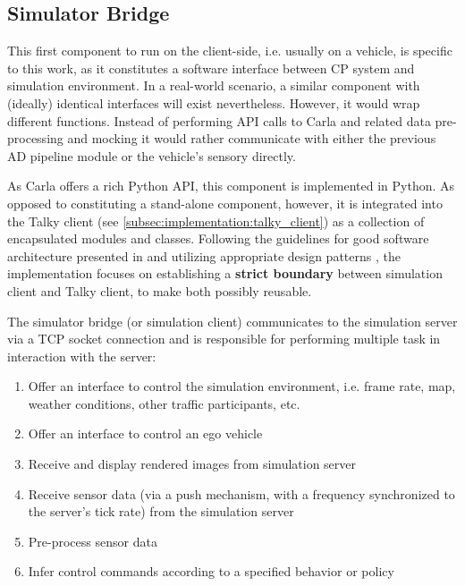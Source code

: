 \subsection{Simulator Bridge}
\label{subsec:implementation:simulator_bridge}
This first component to run on the client-side, i.e. usually on a vehicle, is specific to this work, as it constitutes a software interface between CP system and simulation environment. In a real-world scenario, a similar component with (ideally) identical interfaces will exist nevertheless. However, it would wrap different functions. Instead of performing API calls to Carla and related data pre-processing and mocking it would rather communicate with either the previous AD pipeline module or the vehicle's sensory directly. 

As Carla offers a rich Python API, this component is implemented in Python. As opposed to constituting a stand-alone component, however, it is integrated into the Talky client (see \cref{subsec:implementation:talky_client}) as a collection of encapsulated modules and classes. Following the guidelines for good software architecture presented in \cite{Martin2017} and utilizing appropriate design patterns \cite{EricFreemanElisabethFreemanBertBates2013}, the implementation focuses on establishing a \textbf{strict boundary} between simulation client and Talky client, to make both possibly reusable.

The simulator bridge (or simulation client) communicates to the simulation server via a TCP socket connection and is responsible for performing multiple task in interaction with the server:

\begin{enumerate}
	\item Offer an interface to control the simulation environment, i.e. frame rate, map, weather conditions, other traffic participants, etc.
	\item Offer an interface to control an ego vehicle
	\item Receive and display rendered images from simulation server
	\item Receive sensor data (via a push mechanism, with a frequency synchronized to the server's tick rate) from the simulation server
	\item Pre-process sensor data
	\item Infer control commands according to a specified behavior or policy
\end{enumerate}

